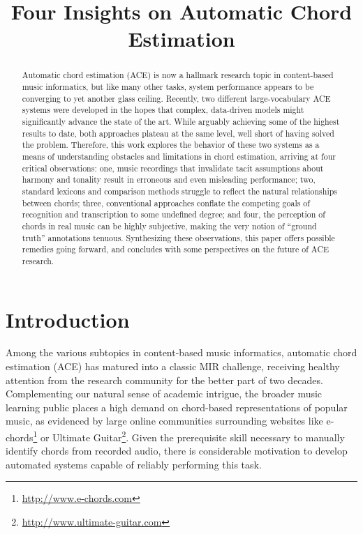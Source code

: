 \documentclass{article}
\title{Four Insights on Automatic Chord Estimation}
\begin{document}
%
\maketitle
%
\begin{abstract}

Automatic chord estimation (ACE) is now a hallmark research topic in content-based music informatics, but like many other tasks, system performance appears to be converging to yet another glass ceiling.
Recently, two different large-vocabulary ACE systems were developed in the hopes that complex, data-driven models might significantly advance the state of the art.
While arguably achieving some of the highest results to date, both approaches plateau at the same level, well short of having solved the problem.
Therefore, this work explores the behavior of these two systems as a means of understanding obstacles and limitations in chord estimation, arriving at four critical observations:
one, music recordings that invalidate tacit assumptions about harmony and tonality result in erroneous and even misleading performance;
two, standard lexicons and comparison methods struggle to reflect the natural relationships between chords;
three, conventional approaches conflate the competing goals of recognition and transcription to some undefined degree;
and four, the perception of chords in real music can be highly subjective, making the very notion of ``ground truth'' annotations tenuous.
Synthesizing these observations, this paper offers possible remedies going forward, and concludes with some perspectives on the future of ACE research.

\end{abstract}


\section{Introduction}
\label{sec:introduction}

Among the various subtopics in content-based music informatics, automatic chord estimation (ACE) has matured into a classic MIR challenge, receiving healthy attention from the research community for the better part of two decades.
Complementing our natural sense of academic intrigue, the broader music learning public places a high demand on chord-based representations of popular music, as evidenced by large online communities surrounding websites like e-chords\footnote{\url{http://www.e-chords.com}} or Ultimate Guitar\footnote{\url{http://www.ultimate-guitar.com}}.
Given the prerequisite skill necessary to manually identify chords from recorded audio, there is considerable motivation to develop automated systems capable of reliably performing this task.
\end{document}
